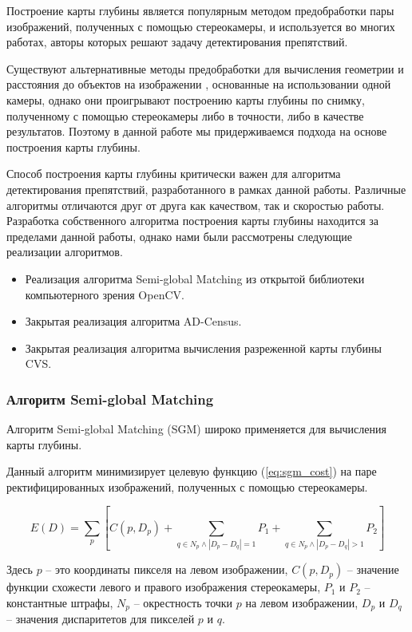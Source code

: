 \documentclass[aps,%
14pt,%
final,%
oneside,
onecolumn,%
musixtex, %
superscriptaddress,%
centertags]{extarticle} %
\begin{document}
Построение карты глубины является популярным методом предобработки пары изображений, полученных с помощью стереокамеры, и используется во многих работах, авторы которых решают задачу детектирования препятствий.

Существуют альтернативные методы предобработки для вычисления геометрии и расстояния до объектов на изображении \cite{monodepth17, koenderink1991affine}, основанные на использовании одной камеры, однако они проигрывают построению карты глубины по снимку, полученному с помощью стереокамеры либо в точности, либо в качестве результатов. Поэтому в данной работе мы придерживаемся подхода на основе построения карты глубины.

Способ построения карты глубины критически важен для алгоритма детектирования препятствий, разработанного в рамках данной работы. Различные алгоритмы отличаются друг от друга как качеством, так и скоростью работы. Разработка собственного алгоритма построения карты глубины находится за пределами данной работы, однако нами были рассмотрены следующие реализации алгоритмов.
\begin{itemize}
\item Реализация алгоритма Semi-global Matching из открытой библиотеки компьютерного зрения OpenCV\cite{itseez2015opencv}.
\item Закрытая реализация алгоритма AD-Census.
\item Закрытая реализация алгоритма вычисления разреженной карты глубины CVS.
\end{itemize}

\subsubsection{Алгоритм Semi-global Matching}
Алгоритм Semi-global Matching \cite{hirschmuller2005accurate} (SGM) широко применяется для вычисления карты глубины.

Данный алгоритм минимизирует целевую функцию (\ref{eq:sgm_cost}) на паре ректифицированных изображений, полученных с помощью стереокамеры.

\begin{equation} \label{eq:sgm_cost}
E(D)=\sum_p [C(p, D_p) + \sum_{q \in N_p \land |D_p - D_q| = 1} P_1 + \sum_{q \in N_p \land |D_p - D_q| > 1} P_2]
\end{equation}

Здесь $p$ -- это координаты пикселя на левом изображении, $C(p, D_p)$ -- значение функции схожести левого и правого изображения стереокамеры, $P_1$ и $P_2$ -- константные штрафы, $N_p$ -- окрестность точки $p$ на левом изображении, $D_p$ и $D_q$ -- значения диспаритетов для пикселей $p$ и $q$.
\end{document}
